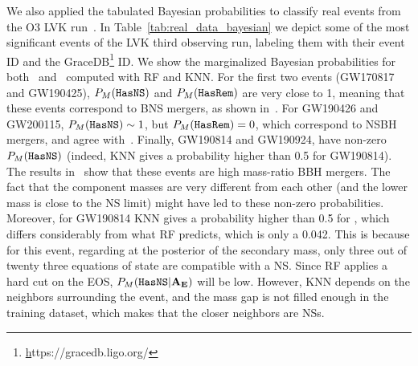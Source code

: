 We also applied the tabulated Bayesian probabilities to classify real events
from the O3 LVK run~\cite{LIGOScientific:2020ibl, LIGOScientific:2021djp}.  In Table~\ref{tab:real_data_bayesian} we depict some of the most significant events of the LVK third observing run, labeling them with their event ID and the GraceDB\footnote{\href{https://gracedb.ligo.org/}https://gracedb.ligo.org/} ID.  We show the marginalized Bayesian probabilities for both \hasns\ and \hasrem\ computed with 
\ac{RF} and \ac{KNN}. For the first two events (GW170817 and GW190425),
$P_M({{\tt HasNS}})$ and $P_M({{\tt HasRem}})$ are very close to 1, meaning that these events
correspond to BNS mergers, as shown in~\cite{LIGOScientific:2020ibl,LIGOScientific:2021djp}. 
For GW190426 and GW200115, $P_M({{\tt HasNS}}) \sim 1$, but
$P_M({{\tt HasRem}}) = 0$, which correspond to NSBH mergers, and agree 
with~\cite{LIGOScientific:2020ibl, LIGOScientific:2021djp}. Finally, GW190814 and GW190924,
have non-zero $P_M({{\tt HasNS}})$ (indeed, \ac{KNN} gives a probability higher than
0.5 for GW190814). The results in~\cite{LIGOScientific:2020ibl, LIGOScientific:2021djp} show that these events are high mass-ratio BBH mergers. The fact that the component masses are very different from each other (and the lower mass is close to the NS limit) might have led to these non-zero probabilities. Moreover, for GW190814 \ac{KNN} gives a probability higher than 0.5 for \hasns, which differs considerably from what \ac{RF} predicts, which is only a 0.042. This is because for this event, regarding at the posterior of the secondary mass, only three out of twenty three equations of state are compatible with a NS. Since \ac{RF} applies a hard cut on the EOS, $P_M({{\tt HasNS}}|{\bf A}_{\bf E})$ will be low. However, \ac{KNN} depends on the neighbors surrounding the event, and the mass gap is not filled enough in the training dataset, which makes that the closer neighbors are NSs. 

